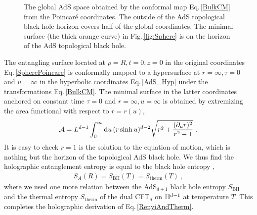 \begin{figure}[htbp]
\centering
{}

\caption{The global AdS space obtained by the conformal map Eq.\,\eqref{BulkCM} from the Poincar{\'e} coordinates. The outside of the AdS topological black hole horizon covers half of the global coordinates. The minimal surface (the thick orange curve) in Fig.\,\ref{fig:Sphere} is on the horizon of the AdS topological black hole.
}
\label{fig:TopAdS}
\end{figure}

The entangling surface located at $\rho = R, t=0, z=0$ in the original coordinates Eq.\,\eqref{SpherePoincare} is conformally mapped to a hypersurface at $r=\infty, \tau=0$ and $u=\infty$ in the hyperbolic coordinates Eq.\,\eqref{AdS_Hyp} under the transformations Eq.\,\eqref{BulkCM}.
The minimal surface in the latter coordinates anchored on constant time $\tau=0$ and $r=\infty, u=\infty$ is obtained by extremizing the area functional with respect to $r=r(u)$,
\begin{align}
\begin{aligned}
{\cal A} = L^{d-1} \int_0^\infty \mathrm{d} u\, (r \sinh u)^{d-2} \sqrt{r^2 + \frac{(\partial_u r)^2}{r^2 -1}} \ .
\end{aligned}
\end{align}
It is easy to check $r=1$ is the solution to the equation of motion, which
is nothing but the horizon of the topological AdS black hole.
We thus find the holographic entanglement entropy is equal to the black hole entropy \cite{Casini:2011kv},
\begin{align}
S_A(R) = S_\text{BH}(T) = S_\text{therm}(T)\ ,
\end{align}
where we used one more relation between the AdS$_{d+1}$ black hole entropy $S_\text{BH}$ and the thermal entropy $S_\text{therm}$ of the dual CFT$_d$ on $\mathbb{H}^{d-1}$ at temperature $T$.
This completes the holographic derivation of Eq.\,\eqref{RenyiAndTherm}.


